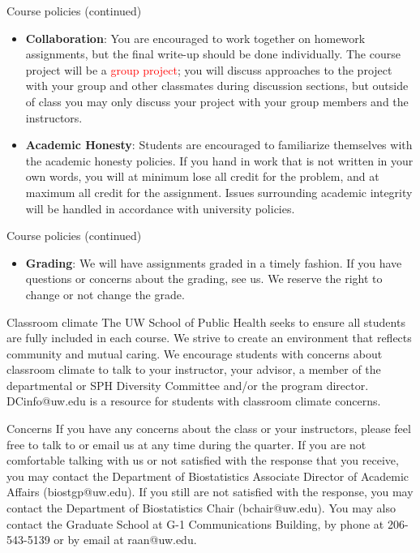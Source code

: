 \documentclass{beamer}
\begin{document}
\begin{frame}{Course policies (continued)}
\begin{itemize}
	\item \textbf{Collaboration}: You are encouraged to work together on homework assignments, but the final write-up should be done individually. The course project will be a \textcolor{red}{group project}; you will discuss approaches to the project with your group and other classmates during discussion sections, but outside of class you may only discuss your project with your group members and the instructors.
	\item \textbf{Academic Honesty}: Students are encouraged to familiarize themselves with the academic honesty policies. If you hand in work that is not written in your own words, you will at minimum lose all credit for the problem, and at maximum all credit for the assignment. Issues surrounding academic integrity will be handled in accordance with university policies.
\end{itemize}
\end{frame}

\begin{frame}{Course policies (continued)}
\begin{itemize}
	\item \textbf{Grading}: We will have assignments graded in a timely fashion. If you have questions or concerns about the grading, see us. We reserve the right to change or not change the grade.
\end{itemize}
\end{frame}

\begin{frame}{Classroom climate}
The UW School of Public Health seeks to ensure all students are fully included in each course. We strive to create an environment that reflects community and mutual caring. We encourage students with concerns about classroom climate to talk to your instructor, your advisor, a member of the departmental or SPH Diversity Committee and/or the program director. DCinfo@uw.edu is a resource for students with classroom climate concerns.
\end{frame}

\begin{frame}{Concerns}
If you have any concerns about the class or your instructors, please feel free to talk to or email us at any time during the quarter. If you are not comfortable talking with us or not satisfied with the response that you receive, you may contact the Department of Biostatistics Associate Director of Academic Affairs (biostgp@uw.edu). If you still are not satisfied with the response, you may contact the Department of Biostatistics Chair (bchair@uw.edu). You may also contact the Graduate School at G-1 Communications Building, by phone at 206-543-5139 or by email at raan@uw.edu.
\end{frame}
\end{document}
